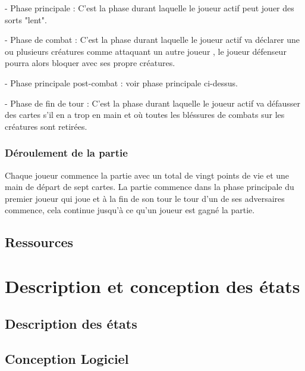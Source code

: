 \documentclass[a4paper,12pt]{article}
\begin{document}
- Phase principale : C'est la phase durant laquelle le joueur actif peut jouer des sorts "lent".

- Phase de combat : C'est la phase durant laquelle le joueur actif va déclarer une ou plusieurs créatures comme attaquant un autre joueur , le joueur défenseur pourra alors bloquer avec ses propre créatures.

- Phase principale post-combat : voir phase principale ci-dessus.

- Phase de fin de tour : C'est la phase durant laquelle le joueur actif va défausser des cartes s'il en a trop en main et où toutes les bléssures de combats sur les créatures sont retirées.

\subsubsection{Déroulement de la partie}
Chaque joueur commence la partie avec un total de vingt points de vie et une main de départ de sept cartes.
La partie commence dans la phase principale du premier joueur qui joue et à la fin de son tour le tour d'un de ses adversaires commence, cela continue jusqu'à ce qu'un joueur est gagné la partie.

\subsection{Ressources}



\clearpage
\section{Description et conception des états}

\subsection{Description des états}


\subsection{Conception Logiciel}


\end{document}
